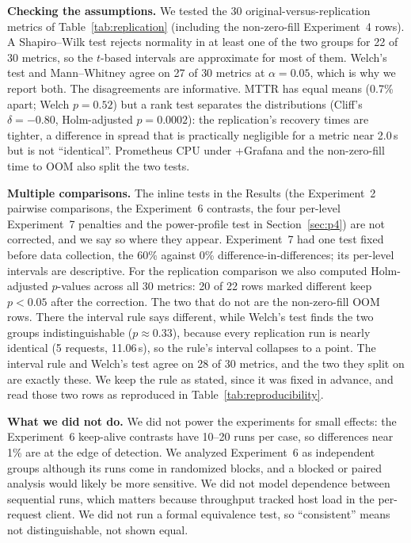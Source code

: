 \documentclass[conference]{IEEEtran}
\begin{document}
\textbf{Checking the assumptions.} We tested the 30 original-versus-replication
metrics of Table~\ref{tab:replication} (including the non-zero-fill Experiment~4 rows). A
Shapiro--Wilk test rejects normality in at least one of the two groups for 22 of 30 metrics,
so the $t$-based intervals are approximate for most of them. Welch's test and
Mann--Whitney agree on 27 of 30 metrics at $\alpha{=}0.05$, which
is why we report both. The disagreements are informative. MTTR has equal means
(0.7\% apart; Welch $p{=}0.52$) but a rank test separates the distributions
(Cliff's $\delta{=}-0.80$, Holm-adjusted $p{=}0.0002$): the replication's recovery times
are tighter, a difference in spread that is practically negligible for a metric
near 2.0\,s but is not ``identical''. Prometheus CPU under +Grafana and the
non-zero-fill time to OOM also split the two tests.

\textbf{Multiple comparisons.} The inline tests in the Results (the
Experiment~2 pairwise comparisons, the Experiment~6 contrasts, the four per-level
Experiment~7 penalties and the power-profile test in Section~\ref{sec:p4}) are not
corrected, and we say so where they appear. Experiment~7 had one test fixed before data
collection, the 60\% against 0\% difference-in-differences; its per-level intervals are
descriptive. For the replication comparison we
also computed Holm-adjusted $p$-values across all 30 metrics: 20 of 22 rows marked
different keep $p<0.05$ after the correction. The two that do not are the
non-zero-fill OOM rows. There the interval rule says different, while Welch's
test finds the two groups indistinguishable ($p{\approx}0.33$), because every
replication run is nearly identical (5 requests, 11.06\,s), so the rule's
interval collapses to a point. The interval rule and Welch's test agree on
28 of 30 metrics, and the two they split on are exactly these. We keep the
rule as stated, since it was fixed in advance, and read those two rows as
reproduced in Table~\ref{tab:reproducibility}.

\textbf{What we did not do.} We did not power the experiments for small effects:
the Experiment~6 keep-alive contrasts have 10--20 runs per case, so differences
near 1\% are at the edge of detection. We analyzed Experiment~6 as independent
groups although its runs come in randomized blocks, and a blocked or paired
analysis would likely be more sensitive. We did not model dependence between
sequential runs, which matters because throughput tracked host load in the
per-request client. We did not run a formal equivalence test, so ``consistent'' means
not distinguishable, not shown equal.
\end{document}
